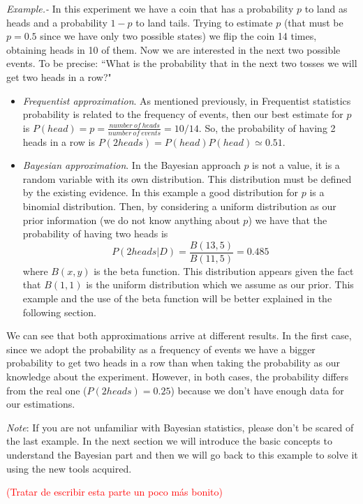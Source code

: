 \documentclass[onecolumn,           %
               showpacs,            %
               preprintnumbers,     %
               aps,                 %
               prl,          	    %
               letterpaper,             %
               superscriptaddress,      %
               nofootinbib,         %
               tightenlines,        %
               floats,floatfix      %
               ,usenatbib,
               ]{revtex4-1}
\begin{document}
\textit{Example.-} In this experiment we have a coin that has a probability $p$ to land as heads and a probability $1-p$ to land tails. Trying to estimate $p$ (that must be $p=0.5$ since we have only two possible states) we flip the coin 14 times, obtaining heads in 10 of them. Now we are interested in the next two possible events. To be precise: ``What is the probability that in the next two tosses we will get two heads in a row?"
\begin{itemize}
\item \textit{Frequentist approximation}. As mentioned previously, in Frequentist statistics probability is related to the frequency of events, then our best estimate for $p$ is $P(head)=p=\frac{number \: of\: heads}{number\: of\: events}=10/14$. So, the probability of having 2 heads in a row is $P(2heads)=P(head)P(head)\simeq 0.51$.  
\item \textit{Bayesian approximation}. In the Bayesian approach $p$ is not a value, it is a random variable with its own distribution. This distribution must be defined by the existing evidence. In this example a good distribution for $p$ is a binomial distribution. Then, by considering a uniform distribution as our prior information (we do not know anything about $p$) we have that the probability of having two heads is
\[
P(2heads|D)=\frac{B(13,5)}{B(11,5)}=0.485
\]
where $B(x,y)$ is the beta function. This distribution appears given the fact that $B(1,1)$ is the uniform distribution which we assume as our prior. This example and the use of the beta function will be better explained in the following section. 
\end{itemize}

We can see that both approximations arrive at different results. In the first case, since we adopt the probability as a frequency of events we have a bigger probability to get two heads in a row than when taking the probability as our knowledge about the experiment. However, in both cases, the probability differs from the real one ($P(2heads)=0.25$) because we don't have enough data for our estimations.

\textit{Note}: If you are not unfamiliar with Bayesian statistics, please don't be scared of the last example. In the next section we will introduce the basic concepts to understand the Bayesian part and then we will go back to this example to solve it using the new tools acquired.   

\textcolor{red}{(Tratar de escribir esta parte un poco m\'as bonito)}
\end{document}
